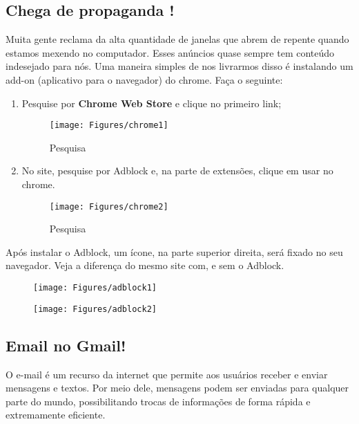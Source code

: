 \documentclass[hidelinks,12pt]{article}
\begin{document}
			\subsection{Chega de propaganda !}

			Muita gente reclama da alta quantidade de janelas que abrem de repente quando estamos mexendo no computador. Esses anúncios quase sempre tem conteúdo indesejado para nós. Uma maneira simples de nos livrarmos disso é instalando um add-on (aplicativo para o navegador) do chrome. Faça o seguinte:

			\begin{enumerate}
				\item Pesquise por \textbf{Chrome Web Store} e clique no primeiro link;

				\begin{figure}[!h]
					\centering
					\texttt{[image: Figures/chrome1]}
					\label{fig:chrome1}
					\caption{Pesquisa}
				\end{figure}

				\item No site, pesquise por Adblock e, na parte de extensões, clique em usar no chrome.

				\begin{figure}[!h]
					\centering
					\texttt{[image: Figures/chrome2]}
					\label{fig:chrome2}
					\caption{Pesquisa}
				\end{figure}

			\end{enumerate}

			Após instalar o Adblock, um ícone, na parte superior direita, será fixado no seu navegador. Veja a diferença do mesmo site com, e sem o Adblock.

			\begin{figure}[!htbp]
				\centering
				\begin{minipage}[b]{0.5\textwidth}
					\texttt{[image: Figures/adblock1]}\\

				\end{minipage}
				\hfill
				\begin{minipage}[b]{0.5\textwidth}
					\texttt{[image: Figures/adblock2]}

				\end{minipage}
			\end{figure}


			\newpage
		\subsection{Email no Gmail!}
			 O e-mail é um recurso da internet que permite aos usuários receber e enviar mensagens e textos. Por meio dele, mensagens podem ser enviadas para qualquer parte do mundo, possibilitando trocas de informações de forma rápida e extremamente eficiente.
\end{document}
